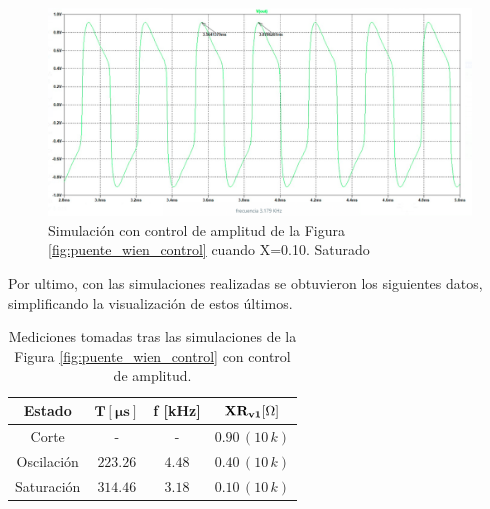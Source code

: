 \begin{enumerate}
\begin{itemize}
                    \begin{figure}[H]
                        \centering
                        \renewcommand{\figurename}{Gráfica}
                        \setcounter{figure}{7}
                        \includegraphics[width=15cm]{Imagenes/sim_puente_wien_control9.png}
                        \caption{Simulación con control de amplitud de la Figura \ref{fig:puente_wien_control} cuando X=0.10. Saturado}
                        \label{fig:sim_puente_wien_control9}
                    \end{figure}
                    
                    
                    Por ultimo, con las simulaciones realizadas se obtuvieron los siguientes datos, simplificando la visualización de estos últimos.

                    \begin{table}[H]
                      \centering
                      \begin{tabular}{|c|c|c|c|}
                        \hline
                        \textbf{Estado} & $\mathbf{\text{T} [\mu s]}$ & \textbf{f [kHz]} & $\mathbf{XR_{v1} [\ohm]}$ \\
                        \hline
                        Corte & - & - & $0.90 \, (10 \, k)$ \\
                        \hline
                        Oscilación & $223.26$ & $4.48$ & $0.40 \, (10 \, k)$ \\
                        \hline
                        Saturación & $314.46$ & $3.18$ & $0.10 \, (10 \, k)$ \\
                        \hline
                      \end{tabular}
                      \caption{Mediciones tomadas tras las simulaciones de la Figura \ref{fig:puente_wien_control} con control de amplitud.}
                      \label{tab:sim_puente_wien_control}
                    \end{table}

                    
            \end{itemize}
    \end{enumerate}

